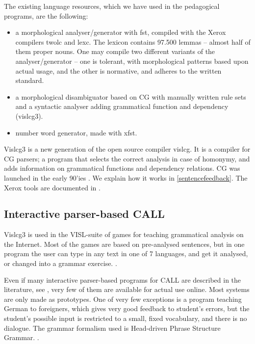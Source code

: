 \documentclass[11pt]{article}
\begin{document}
The existing language resources, which we have used in the pedagogical programs, are the following:

\begin{itemize}
\item a morphological analyser/generator with fst, compiled with the Xerox compilers twolc and lexc.  The lexicon contains 97.500 lemmas -- almost half of them proper nouns. One may compile two different variants of the analyser/generator -- one is tolerant, with morphological patterns based upon actual usage, and the other is normative, and adheres to the written standard. 
\item a morphological disambiguator based on CG with manually written rule sets and a syntactic analyser adding grammatical function and dependency (vislcg3). 
\item number word generator, made with xfst.
\end{itemize}

Vislcg3 is a new generation of the open source compiler vislcg. It is a compiler for CG parsers; a program that selects the correct analysis in case of homonymy, and adds information on grammatical functions and dependency relations. CG was launched in the early 90'ies \cite{Karlsson:95}. We explain how it works in \ref{sentencefeedback}. The Xerox tools are documented in \cite{BeesleyKarttunen:03}. 

\subsection{Interactive parser-based CALL}

Vislcg3 is used in the VISL-suite of games for teaching grammatical analysis on the Internet. Most of the games are based on pre-analysed sentences, but in one program the user can type in any text in one of 7 languages, and get it analysed, or changed into a grammar exercise. \cite{Bick:05}.

Even if many interactive parser-based programs for CALL are described in the literature, see \cite{Gamper:02,Heift:07}, very few of them are available for actual use online. Most systems are only made as prototypes. One of very few exceptions is a program teaching German to foreigners, which gives very good feedback to student's errors, but the student's possible input is restricted to a small, fixed vocabulary, and there is no dialogue. The grammar formalism used is Head-driven Phrase Structure Grammar. \cite{Heift:01,Heift:02}.
\end{document}
